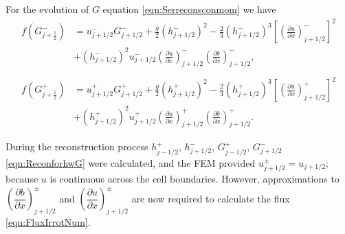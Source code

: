 For the evolution of $G$ equation \eqref{eqn:Serreconsconmom} we have 
\begin{subequations}
\begin{align}
f\left(G^-_{j+\frac{1}{2}}\right) &=  u^-_{j + 1/2} G^-_{j + 1/2}  + \frac{g}{2}\left(h^-_{j + 1/2} \right)^2 - \frac{2}{3}\left(h^-_{j + 1/2}\right)^3 \left[\left(\frac{\partial {u}}{\partial x} \right)^-_{j + 1/2} \right]^2 \nonumber\\ &+ \left(h^-_{j + 1/2}\right)^2 u^-_{j + 1/2} \left(\frac{\partial {u}}{\partial x} \right)^-_{j + 1/2} \left(\frac{\partial b}{\partial x} \right)^-_{j + 1/2}  ,\\ \nonumber \\
f\left(G^+_{j+\frac{1}{2}}\right) &= u^+_{j + 1/2} G^+_{j + 1/2}  + \frac{g}{2}\left(h^+_{j + 1/2} \right)^2 - \frac{2}{3}\left(h^+_{j + 1/2}\right)^3 \left[\left(\frac{\partial {u}}{\partial x} \right)^+_{j + 1/2} \right]^2 \nonumber\\ &+ \left(h^+_{j + 1/2}\right)^2 u^+_{j + 1/2} \left(\frac{\partial {u}}{\partial x} \right)^+_{j + 1/2} \left(\frac{\partial b}{\partial x} \right)^+_{j + 1/2}.
\end{align}
\label{eqn:FluxIrrotNum}
\end{subequations}

During the reconstruction process $h^+_{j - 1/2}$, $h^-_{j + 1/2}$, $G^+_{j - 1/2}$, $G^-_{j + 1/2}$ \eqref{eqn:ReconforhwG} were calculated, and the FEM provided $u^\pm_{j+1/2} = u_{j+1/2}$; because $u$ is continuous across the cell boundaries. However, approximations to $\left(\dfrac{\partial {b}}{\partial x} \right)^\pm_{j + 1/2}$ and $\left(\dfrac{\partial {u}}{\partial x} \right)^\pm_{j + 1/2}$ are now required to calculate the flux \eqref{eqn:FluxIrrotNum}. 

